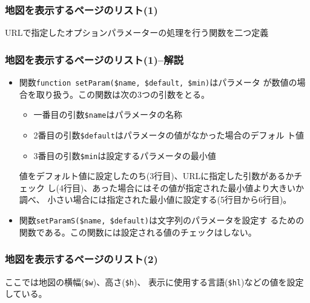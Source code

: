 \documentclass[dvipsk]{beamer}
\begin{document}
\begin{frame}[containsverbatim]
\frametitle{地図を表示するページのリスト(1)}
URLで指定したオプションパラメーターの処理を行う関数を二つ定義
{\small
{}
}
\end{frame}
\begin{frame}[containsverbatim]
\frametitle{地図を表示するページのリスト(1)--解説}
\begin{itemize}
 \item 関数\verb+function setParam($name, $default, $min)+はパラメータ
       が数値の場合を取り扱う。この関数は次の3つの引数をとる。
\begin{itemize}
 \item 一番目の引数\verb+$name+はパラメータの名称
 \item 2番目の引数\verb+$default+はパラメータの値がなかった場合のデフォル
       ト値
 \item 3番目の引数\verb+$min+は設定するパラメータの最小値
\end{itemize}
値をデフォルト値に設定したのち(3行目)、URLに指定した引数があるかチェック
       し(4行目)、あった場合にはその値が指定された最小値より大きいか調べ、
       小さい場合には指定された最小値に設定する(5行目から6行目)。
 \item 関数\verb+setParamS($name, $default)+は文字列のパラメータを設定す
       るための関数である。この関数には設定される値のチェックはしない。
\end{itemize}
\end{frame}
\begin{frame}[containsverbatim]
\frametitle{地図を表示するページのリスト(2)}
ここでは地図の横幅(\verb+$w+)、高さ(\verb+$h+)、
表示に使用する言語(\verb+$hl+)などの値を設定している。
\end{frame}
\end{document}
